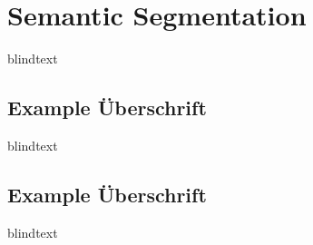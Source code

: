 \section{Semantic Segmentation}
\label{sec:SemanticSegmentation}

blindtext

\subsection{Example Überschrift}

blindtext

\subsection{Example Überschrift}

blindtext